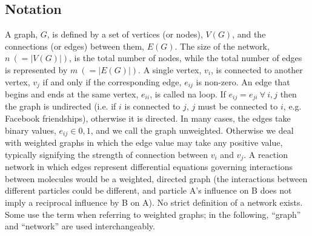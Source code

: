 \documentclass[11pt]{article}
\begin{document}
\subsection{Notation}
\indent A graph, $G$, is defined by a set of vertices (or nodes), $V(G)$, and the connections (or edges) between them, $E(G)$. The size of the network, $n \ ( = |V(G)|)$, is the total number of nodes, while the total number of edges is represented by $m \ (= |E(G)|)$. A single vertex, $v_{i}$, is connected to another vertex, $v_{j}$ if and only if the corresponding edge, $e_{ij}$ is non-zero. An edge that begins and ends at the same vertex, $e_{ii}$, is called na loop. If $e_{ij} = e_{ji} \ \forall \ i,j$ then the graph is undirected (i.e. if $i$ is connected to $j$, $j$ must be connected to $i$, e.g. Facebook friendships), otherwise it is directed. In many cases, the edges take binary values, $e_{ij} \in {0,1}$, and we call the graph unweighted. Otherwise we deal with weighted graphs in which the edge value may take any positive value, typically signifying the strength of connection between $v_{i}$ and $v_{j}$. A reaction network in which edges represent differential equations governing interactions between molecules would be a weighted, directed graph (the interactions between different particles could be different, and particle A's influence on B does not imply a reciprocal influence by B on A). No strict definition of a network exists. Some use the term when referring to weighted graphs; in the following, ``graph'' and ``network'' are used interchangeably. \vspace{1mm}
\end{document}
